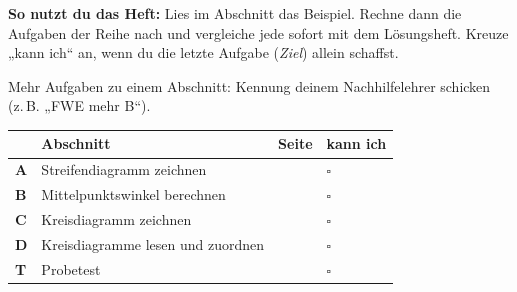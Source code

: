 \documentclass[11pt]{article}
\begin{document}
\par\smallskip
{}\par\medskip
\noindent\textbf{So nutzt du das Heft:} Lies im Abschnitt das Beispiel. Rechne dann die Aufgaben der Reihe nach und vergleiche jede sofort mit dem Lösungsheft. Kreuze „kann ich“ an, wenn du die letzte Aufgabe (\emph{Ziel}) allein schaffst.\par
\noindent Mehr Aufgaben zu einem Abschnitt: Kennung deinem Nachhilfelehrer schicken (z.\,B. „FWE mehr B“).\par\medskip
{\renewcommand{\arraystretch}{1.3}
\noindent\begin{tabular}{|>{\bfseries}p{10mm}|p{112mm}|>{\raggedleft\arraybackslash}p{10mm}|>{\centering\arraybackslash}p{14mm}|}\hline
\rowcolor{black!8} & \textbf{Abschnitt} & \textbf{Seite} & \textbf{kann ich}\\\hline
A & Streifendiagramm zeichnen & \pageref{s:A} & $\square$\\\hline
B & Mittelpunktswinkel berechnen & \pageref{s:B} & $\square$\\\hline
C & Kreisdiagramm zeichnen & \pageref{s:C} & $\square$\\\hline
D & Kreisdiagramme lesen und zuordnen & \pageref{s:D} & $\square$\\\hline
T & Probetest & \pageref{s:T} & $\square$\\\hline
\end{tabular}}\par\bigskip
\end{document}
